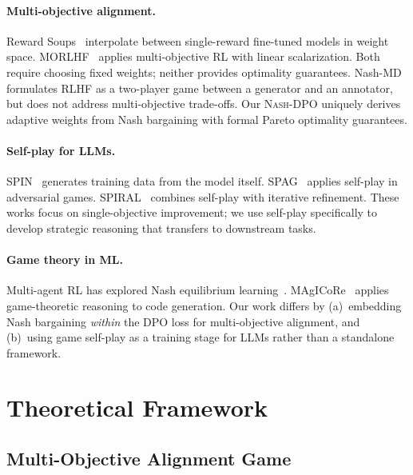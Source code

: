 \documentclass{article}
\newcommand{\NashDPO}{\textsc{Nash-DPO}}
\begin{document}
\paragraph{Multi-objective alignment.}
Reward Soups~\citep{rame2024rewarded} interpolate between single-reward fine-tuned models in weight space.
MORLHF~\citep{wu2024fine} applies multi-objective RL with linear scalarization.
Both require choosing fixed weights; neither provides optimality guarantees.
Nash-MD~\citep{munos2024nash} formulates RLHF as a two-player game between a generator and an annotator, but does not address multi-objective trade-offs.
Our \NashDPO{} uniquely derives adaptive weights from Nash bargaining with formal Pareto optimality guarantees.

\paragraph{Self-play for LLMs.}
SPIN~\citep{chen2024self} generates training data from the model itself.
SPAG~\citep{cheng2024self} applies self-play in adversarial games.
SPIRAL~\citep{yuan2024self} combines self-play with iterative refinement.
These works focus on single-objective improvement; we use self-play specifically to develop strategic reasoning that transfers to downstream tasks.

\paragraph{Game theory in ML.}
Multi-agent RL has explored Nash equilibrium learning~\citep{hu2003nash}.
MAgICoRe~\citep{she2024magicore} applies game-theoretic reasoning to code generation.
Our work differs by (a)~embedding Nash bargaining \emph{within} the DPO loss for multi-objective alignment, and (b)~using game self-play as a training stage for LLMs rather than a standalone framework.


\section{Theoretical Framework}
\label{sec:theory}

\subsection{Multi-Objective Alignment Game}
\end{document}
